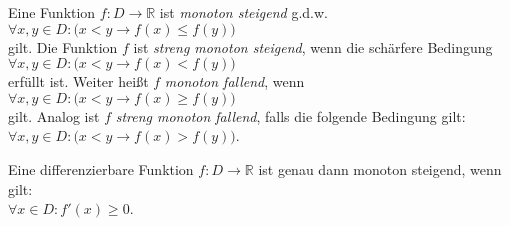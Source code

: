 \begin{Definition}[monoton]
  Eine Funktion $f: D \rightarrow \mathbb{R}$ ist \emph{monoton steigend} g.d.w.
  \\[0.2cm]
  \hspace*{1.3cm}
  $\forall x,y \in D:\bigl(x < y \rightarrow f(x) \leq f(y)\bigr)$
  \\[0.2cm]
  gilt.  Die Funktion $f$ ist \emph{streng monoton steigend}, wenn die sch\"arfere Bedingung
  \\[0.2cm]
  \hspace*{1.3cm}
  $\forall x,y \in D:\bigl(x < y \rightarrow f(x) < f(y)\bigr)$
  \\[0.2cm]
  erf\"ullt ist.  Weiter hei{\ss}t  $f$ \emph{monoton fallend}, wenn
  \\[0.2cm]
  \hspace*{1.3cm}
  $\forall x,y \in D:\bigl(x < y \rightarrow f(x) \geq f(y)\bigr)$
  \\[0.2cm]
  gilt.  Analog ist $f$ \emph{streng monoton fallend}, falls die folgende Bedingung gilt:
  \\[0.2cm]
  \hspace*{1.3cm}
  $\forall x,y \in D:\bigl(x < y \rightarrow f(x) > f(y)\bigr)$.
  \eod
\end{Definition}

\begin{Satz}
  Eine differenzierbare Funktion $f:D \rightarrow \mathbb{R}$ ist genau dann
  monoton steigend, wenn gilt: 
  \\[0.2cm]
  \hspace*{1.3cm} $\forall x \in D: f'(x) \geq 0$.
  \eod
\end{Satz}


